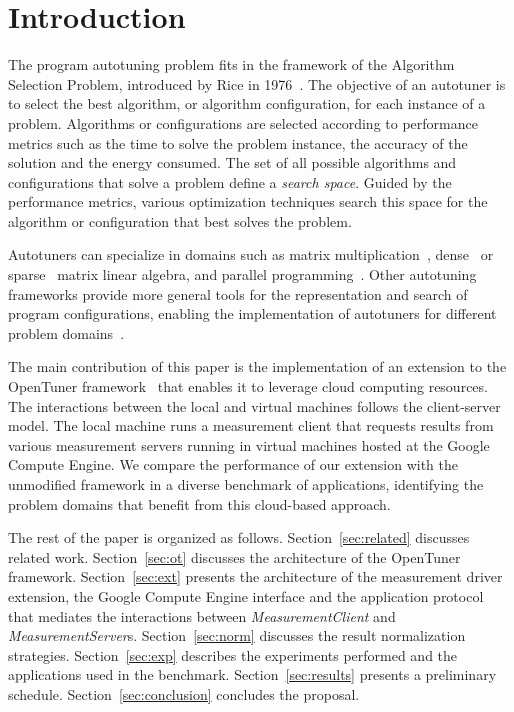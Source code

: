\documentclass[a4paper, 12pt]{article}
\begin{document}
\section{Introduction} \label{sec:intro}

The program autotuning problem fits in the framework of the Algorithm Selection
Problem, introduced by Rice in 1976~\cite{rice1976algorithm}. The objective of
an autotuner is to select the best algorithm, or algorithm configuration, for
each instance of a problem.  Algorithms or configurations are selected
according to performance metrics such as the time to solve the problem
instance, the accuracy of the solution and the energy consumed.  The set of all
possible algorithms and configurations that solve a problem define a
\emph{search space}. Guided by the performance metrics, various optimization
techniques search this space for the algorithm or configuration that best
solves the problem.

Autotuners can specialize in domains such as matrix
multiplication~\cite{bilmes1997phipac}, dense~\cite{whaley1998atlas} or
sparse~\cite{vuduc2005oski} matrix linear algebra, and parallel
programming~\cite{jordan2012multi}. Other autotuning frameworks provide more
general tools for the representation and search of program configurations,
enabling the implementation of autotuners for different problem
domains~\cite{ansel2014opentuner,hutter2009paramils}.

The main contribution of this paper is the implementation of an
extension to the OpenTuner framework~\cite{ansel2014opentuner} that 
enables it to leverage cloud computing resources. 
The interactions between the local and virtual machines follows 
the client-server model. The local machine runs a measurement client that
requests results from various measurement servers running in virtual machines
hosted at the Google Compute Engine.
We compare the performance of our extension with the
unmodified framework in a diverse benchmark of applications, identifying
the problem domains that benefit from this cloud-based approach.

The rest of the paper is organized as follows.
Section~\ref{sec:related} discusses related work.
Section~\ref{sec:ot} discusses the architecture of the OpenTuner framework.
Section~\ref{sec:ext} presents the architecture of the measurement driver
extension, the Google Compute Engine interface and the application protocol
that mediates the interactions between \emph{MeasurementClient} and
\emph{MeasurementServer}s.
Section~\ref{sec:norm} discusses the result normalization strategies.
Section~\ref{sec:exp} describes the experiments performed and the 
applications used in the benchmark.
Section~\ref{sec:results} presents a preliminary schedule.
Section~\ref{sec:conclusion} concludes the proposal.
\end{document}
